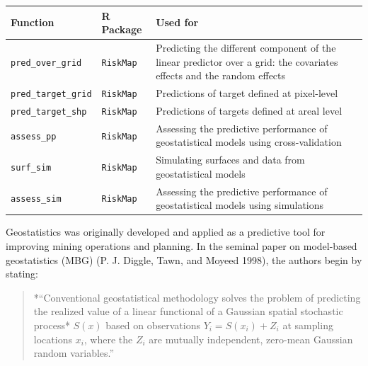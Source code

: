 \documentclass[
  letterpaper,
]{krantz}
\begin{document}
\begin{longtable}[]{@{}
  >{\raggedright\arraybackslash}p{}
  >{\raggedright\arraybackslash}p{}
  >{\raggedright\arraybackslash}p{}@{}}
\toprule\noalign{}
\begin{minipage}[b]{\linewidth}\raggedright
Function
\end{minipage} & \begin{minipage}[b]{\linewidth}\raggedright
R Package
\end{minipage} & \begin{minipage}[b]{\linewidth}\raggedright
Used for
\end{minipage} \\
\midrule\noalign{}
\endhead
\bottomrule\noalign{}
\endlastfoot
\texttt{pred\_over\_grid} & \texttt{RiskMap} & Predicting the different
component of the linear predictor over a grid: the covariates effects
and the random effects \\
\texttt{pred\_target\_grid} & \texttt{RiskMap} & Predictions of target
defined at pixel-level \\
\texttt{pred\_target\_shp} & \texttt{RiskMap} & Predictions of targets
defined at areal level \\
\texttt{assess\_pp} & \texttt{RiskMap} & Assessing the predictive
performance of geostatistical models using cross-validation \\
\texttt{surf\_sim} & \texttt{RiskMap} & Simulating surfaces and data
from geostatistical models \\
\texttt{assess\_sim} & \texttt{RiskMap} & Assessing the predictive
performance of geostatistical models using simulations \\
\end{longtable}

Geostatistics was originally developed and applied as a predictive tool
for improving mining operations and planning. In the seminal paper on
model-based geostatistics (MBG) (P. J. Diggle, Tawn, and Moyeed 1998),
the authors begin by stating:

\begin{quote}
*``Conventional geostatistical methodology solves the problem of
predicting the realized value of a linear functional of a Gaussian
spatial stochastic process* \(S(x)\) based on observations
\(Y_i= S(x_i) + Z_i\) at sampling locations \(x_i\), where the \(Z_i\)
are mutually independent, zero-mean Gaussian random variables.''
\end{quote}
\end{document}
